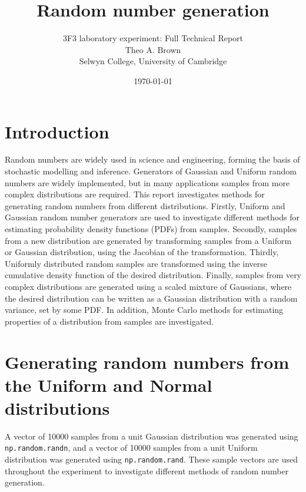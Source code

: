 \documentclass[a4paper]{article}
\begin{document}

\title{Random number generation}
\author{3F3 laboratory experiment: Full Technical Report \\ Theo A. Brown \\ Selwyn College, University of Cambridge}
\date{\today}
\maketitle

\tableofcontents
\newpage


\section{Introduction}
Random numbers are widely used in science and engineering, forming the basis of stochastic modelling and inference.
Generators of Gaussian and Uniform random numbers are widely implemented, but in many applications samples from more
complex distributions are required.
This report investigates methods for generating random numbers from different distributions.
Firstly, Uniform and Gaussian random number generators are used to investigate different methods for estimating
probability density functions (PDFs) from samples.
Secondly, samples from a new distribution are generated by transforming samples from a Uniform or Gaussian distribution,
using the Jacobian of the transformation.
Thirdly, Uniformly distributed random samples are transformed using the inverse cumulative density function of the
desired distribution.
Finally, samples from very complex distributions are generated using a scaled mixture of Gaussians, where the desired
distribution can be written as a Gaussian distribution with a random variance, set by some PDF.
In addition, Monte Carlo methods for estimating properties of a distribution from samples are investigated.



\section{Generating random numbers from the Uniform and Normal distributions}
\label{sec:uniform_normal}

A vector of 10000 samples from a unit Gaussian distribution was generated using \verb`np.random.randn`, and a vector of
10000 samples from a unit Uniform distribution was generated using \verb`np.random.rand`.
These sample vectors are used throughout the experiment to investigate different methods of random number generation.
\end{document}
